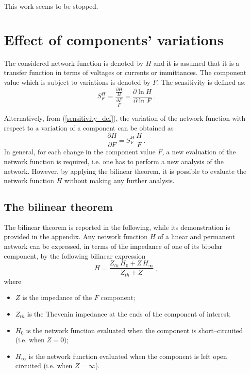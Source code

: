 \documentclass[journal]{IEEEtran}
\begin{document}
This work seems to be stopped.

\section{Effect of components' variations}
The considered network function is denoted by $H$ and it is assumed that it is a transfer function in terms of voltages or currents or immittances. The component value which is subject to variations is denoted by $F$. 
The sensitivity is defined as:
%
\begin{equation}
S_{F}^H = \frac
{\frac{\partial H}{H}}
{\frac{\partial F}{F}}
= \frac{\partial \ln{H}}{\partial \ln{F}} \, .
\label{sensitivity_def}
\end{equation}

%
Alternatively, from (\ref{sensitivity_def}), the variation of the network function with respect to a variation of a component  can be obtained as
%
\begin{equation}
\frac{\partial {H}}{\partial {F}} 
= 
S_{F}^H \,
\frac{H}{F} \, .
\label{VIII.1.2}
\end{equation}
%
In general, for each change in the component value $F$, a new evaluation of the network function is required, i.e. one has to perform a new analysis of the network.
However, by applying the bilinear theorem, it is possible to evaluate the network function $H$ without making any further analysis.

\subsection{The bilinear theorem}
The bilinear theorem is reported in the following, while its demonstration is provided in the appendix.
Any network function $H$ of a linear and permanent network can be expressed, in terms of the impedance of one of its bipolar component, by the following bilinear expression
%
\begin{equation}
H = \frac{Z_{th} \, H_0 + Z \, H_{\infty}}{Z_{th}+Z} \, ,
\label{VIII.1.3}
\end{equation}
%
where
\begin{itemize}
\item $Z$ is the impedance of the $F$ component;
\item $Z_{th}$ is the Thevenin impedance at the ends of the component of interest;
\item $H_0$ is the network function evaluated when the component is short--circuited (i.e. when $Z=0$);
\item $H_\infty$ is the network function evaluated when the component is left open circuited (i.e. when $Z=\infty$).
\end{itemize}
\end{document}
